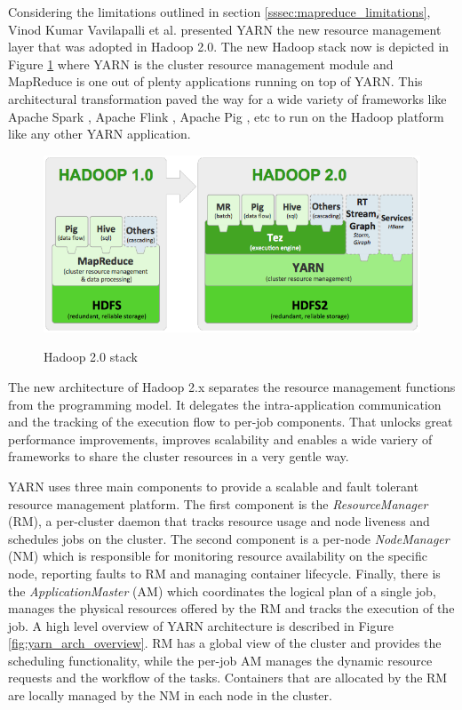 Considering the limitations outlined in section
\ref{sssec:mapreduce_limitations}, Vinod Kumar Vavilapalli et
al. presented YARN \cite{Vavilapalli:2013:AHY:2523616.2523633} the new
resource management layer that was adopted in Hadoop 2.0. The new
Hadoop stack now is depicted in Figure \ref{fig:yarn_hadoop1_hadoop2_arch} where YARN is the
cluster resource management module and MapReduce is one out of plenty
applications running on top of YARN. This architectural transformation
paved the way for a wide variety of frameworks like
Apache Spark \cite{apache_spark}, Apache Flink \cite{apache_flink},
Apache Pig \cite{apache_pig}, etc to run on the
Hadoop platform like any other YARN application.

\begin{figure}
\centering
\includegraphics[scale=0.6]{resources/images/Background/hadoop1_hadoop2_arch.png}
\label{fig:yarn_hadoop1_hadoop2_arch}
\caption{Hadoop 2.0 stack \cite{hortonworks_hadoop_stack}}
\end{figure}

The new architecture of Hadoop 2.x separates the resource management
functions from the programming model. It delegates the
intra-application communication and the tracking of the execution flow
to per-job components. That unlocks great performance improvements,
improves scalability and enables a wide variery of frameworks to share
the cluster resources in a very gentle way.

YARN uses three main components to provide a scalable and fault
tolerant resource management platform. The first component is the
\emph{ResourceManager} (RM), a per-cluster daemon that tracks resource
usage and node liveness and schedules jobs on the cluster. The second
component is a per-node \emph{NodeManager} (NM) which is responsible
for monitoring resource availability on the specific node, reporting
faults to RM and managing container lifecycle. Finally, there is the
\emph{ApplicationMaster} (AM) which coordinates the logical plan of a
single job, manages the physical resources offered by the RM and
tracks the execution of the job. A high level overview of YARN
architecture is described in Figure \ref{fig:yarn_arch_overview}. RM
has a global view of the cluster and provides the scheduling
functionality, while the per-job AM manages the dynamic resource
requests and the workflow of the tasks. Containers that are allocated
by the RM are locally managed by the NM in each node in the cluster.

